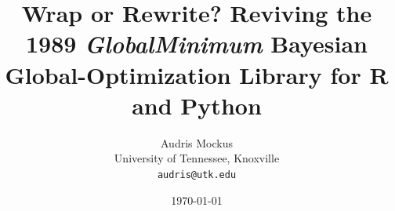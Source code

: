 \documentclass[11pt]{article}
\title{Wrap or Rewrite? Reviving the 1989 \emph{GlobalMinimum} Bayesian
Global-Optimization Library for R and Python}
\author{Audris Mockus\\
  University of Tennessee, Knoxville\\
  \texttt{audris@utk.edu}}
\date{\today}
\begin{document}
\maketitle

\begin{abstract}

\end{abstract}





\end{document}
